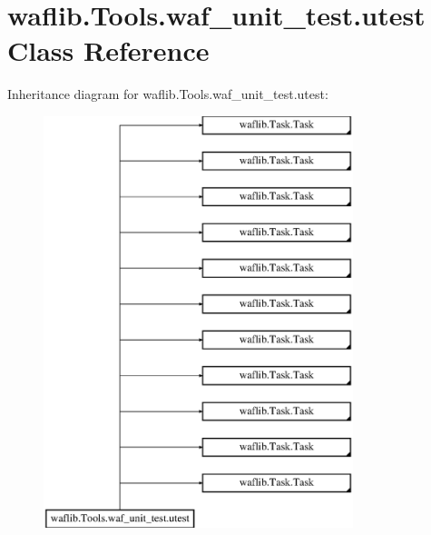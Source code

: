 \hypertarget{classwaflib_1_1_tools_1_1waf__unit__test_1_1utest}{}\section{waflib.\+Tools.\+waf\+\_\+unit\+\_\+test.\+utest Class Reference}
\label{classwaflib_1_1_tools_1_1waf__unit__test_1_1utest}
Inheritance diagram for waflib.\+Tools.\+waf\+\_\+unit\+\_\+test.\+utest\+:\begin{figure}[H]
\begin{center}
\leavevmode
\includegraphics[height=12.000000cm]{classwaflib_1_1_tools_1_1waf__unit__test_1_1utest}
\end{center}
\end{figure}
